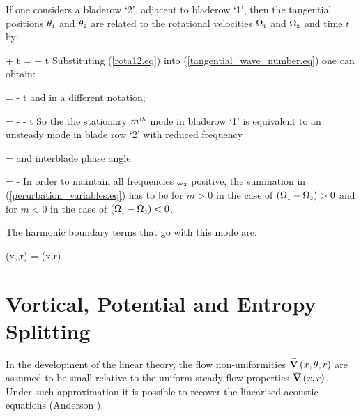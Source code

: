  If one considers a bladerow `2', adjacent to bladerow `1', then
 the tangential positions $\theta_{\mbox{\tiny $1$}}$ and $\theta_{\mbox{\tiny $2$}}$ are
 related to the rotational velocities $\Omega_{\mbox{\tiny $1$}}$ and $\Omega_{\mbox{\tiny $2$}}$
 and time $t$ by:

%
\beq
 \theta{} + \Omega{}t = \theta{} + \Omega{}t
  \label{rota12.eq}
\eeq
%
 Substituting (\ref{rota12.eq}) into (\ref{tangential_wave_number.eq})
 one can obtain:

%
\beq
  \theta{} =
  \theta{} -
  t
\eeq
%
 and in a different notation;

%
\beq
  \theta{} =
  -\theta{} - \omega{} t
\eeq
%
 So the the stationary $m^{\mbox{\tiny $th$}}$ mode in bladerow `1' is equivalent to an unsteady
 mode in blade row `2' with reduced frequency

%
\beq
  \omega{} = 
  \label{frequency_rotaz.eq}
\eeq
%
 and interblade phase angle:

%
\beq
  \phi{} = -
  \label{nterblade_phase_angle.eq}
\eeq
%
 In order to maintain all frequencies $\omega_{\mbox{\tiny $2$}}$ positive, the summation in
 (\ref{perurbation_variables.eq}) has to be for $m > 0$ in the case of
 $\left(\Omega_{\mbox{\tiny $1$}} - \Omega_{\mbox{\tiny $2$}}\right) > 0$ and for $m < 0$ in the case of
 $\left(\Omega_{\mbox{\tiny $1$}} - \Omega_{\mbox{\tiny $2$}}\right) < 0$.

 The harmonic boundary terms that go with this mode are:

%
\beq
  \left(x,\theta{},r\right) =
  \left(x,r\right)
\eeq
%
%
%
%
\section{Vortical, Potential and Entropy Splitting}
%
 In the development of the linear theory, the flow non-uniformities
 $\widetilde{\bf V}\left(x,\theta,r\right)$ are assumed to be small
 relative to the uniform steady flow properties $\overline{\bf V}\left(x,r\right)$.
 Under such approximation it is possible to recover the linearised acoustic
 equations (Anderson ).

